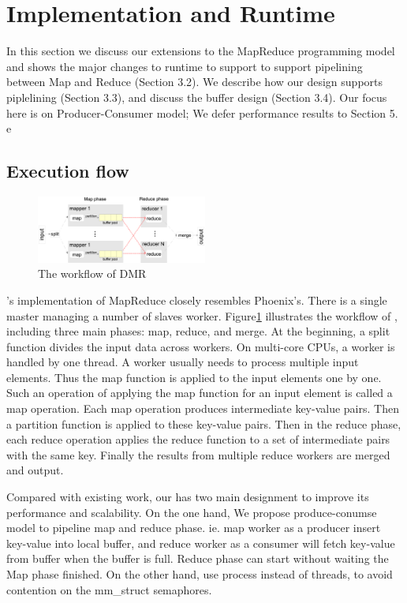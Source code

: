 \section{Implementation and Runtime}
In this section we discuss our extensions to 
the MapReduce programming model and shows the major changes to runtime to 
support \myds
to support pipelining between Map and Reduce (Section 3.2). 
We describe how our design supports
piplelining (Section 3.3), and discuss the buffer design (Section 3.4). 
Our focus here is on Producer-Consumer model; 
We defer performance results to Section 5.
e


\subsection{Execution flow}
\begin{figure}[!h!t]  
    \centering
    \includegraphics[width=0.5\textwidth]{eps/dmr_workflow.eps}
    \caption{The workflow of DMR}
    \label{fig:dmr:workflow}
\end{figure}

\myds’s implementation of MapReduce closely resembles Phoenix’s. 
There is a single master managing a number of slaves worker. 
Figure\ref{fig:dmr:workflow} illustrates the workflow of \myds,
including three main phases: map, reduce, and merge. 
At the beginning, a split function divides the input
data across workers. 
On multi-core CPUs, a worker is handled by one thread. 
A worker usually needs to process multiple input elements. 
Thus the map function is applied to the input elements one by one. 
Such an operation of applying the map function for an input element is 
called a map operation. 
Each map operation produces intermediate key-value pairs. 
Then a partition function is applied to these key-value pairs. 
Then in the reduce phase, each reduce operation
applies the reduce function to a set of intermediate pairs
with the same key. 
Finally the results from multiple reduce workers are merged and output.

Compared with existing work, 
our \myds has two main designment to improve its performance and scalability.
On the one hand, We propose produce-conumse model to 
pipeline map and reduce phase. 
ie. map worker as a producer insert key-value into local buffer,
and reduce worker as a consumer will fetch key-value from buffer
when the buffer is full. 
Reduce phase can start without waiting the Map phase finished.
On the other hand, \myds use process instead of threads, 
to avoid contention on the mm\_struct semaphores.

